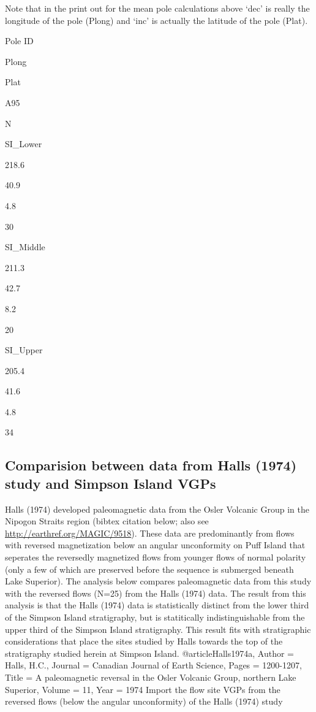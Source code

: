\documentclass[letterpaper,10pt,english]{/Users/polarwander/Library/Enthought/Canopy_64bit/User/lib/python2.7/site-packages/sphinx/texinputs/sphinxhowto}
\begin{document}
        
    
Note that in the print out for the mean pole calculations above `dec' is
really the longitude of the pole (Plong) and `inc' is actually the
latitude of the pole (Plat).

Pole ID

Plong

Plat

A95

N

SI\_Lower

218.6

40.9

4.8

30

SI\_Middle

211.3

42.7

8.2

20

SI\_Upper

205.4

41.6

4.8

34\subsection{Comparision between data from Halls (1974) study and Simpson Island VGPs}Halls (1974) developed paleomagnetic data from the Osler Volcanic Group
in the Nipogon Straits region (bibtex citation below; also see
\url{http://earthref.org/MAGIC/9518}). These data are predominantly from
flows with reversed magnetization below an angular unconformity on Puff
Island that seperates the reversedly magnetized flows from younger flows
of normal polarity (only a few of which are preserved before the
sequence is submerged beneath Lake Superior). The analysis below
compares paleomagnetic data from this study with the reversed flows
(N=25) from the Halls (1974) data. The result from this analysis is that
the Halls (1974) data is statistically distinct from the lower third of
the Simpson Island stratigraphy, but is statitically indistinguishable
from the upper third of the Simpson Island stratigraphy. This result
fits with stratigraphic considerations that place the sites studied by
Halls towards the top of the stratigraphy studied herein at Simpson
Island.
@article{Halls1974a,
        Author = {Halls, H.C.},
        Journal = {Canadian Journal of Earth Science},
        Pages = {1200-1207},
        Title = {A paleomagnetic reversal in the {O}sler {V}olcanic
{G}roup, northern {L}ake {S}uperior},
        Volume = {11},
        Year = {1974}}
Import the flow site VGPs from the reversed flows (below the angular
unconformity) of the Halls (1974) study
\end{document}
